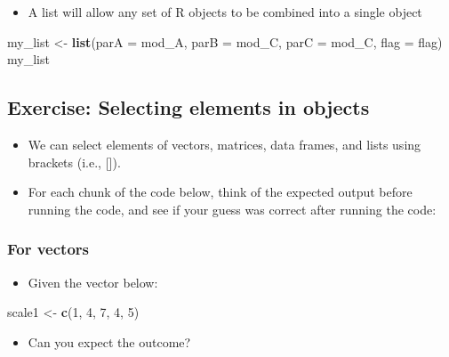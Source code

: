 \documentclass[
]{book}
\newenvironment{Shaded}{\begin{snugshade}}{\end{snugshade}}
\newcommand{\AttributeTok}[1]{\textcolor[rgb]{0.13,0.29,0.53}{#1}}
\newcommand{\DecValTok}[1]{\textcolor[rgb]{0.00,0.00,0.81}{#1}}
\newcommand{\FunctionTok}[1]{\textcolor[rgb]{0.13,0.29,0.53}{\textbf{#1}}}
\newcommand{\NormalTok}[1]{#1}
\newcommand{\OtherTok}[1]{\textcolor[rgb]{0.56,0.35,0.01}{#1}}
\providecommand{\tightlist}{%
  \setlength{\itemsep}{0pt}\setlength{\parskip}{0pt}}
\begin{document}
\begin{itemize}
\tightlist
\item
  A list will allow any set of R objects to be combined into a single object
\end{itemize}

\begin{Shaded}
\begin{Highlighting}[]
\NormalTok{my\_list }\OtherTok{\textless{}{-}} \FunctionTok{list}\NormalTok{(}\AttributeTok{parA =}\NormalTok{ mod\_A, }\AttributeTok{parB =}\NormalTok{ mod\_C, }\AttributeTok{parC =}\NormalTok{ mod\_C, }\AttributeTok{flag =}\NormalTok{ flag)}
\NormalTok{my\_list}
\end{Highlighting}
\end{Shaded}

\subsection{Exercise: Selecting elements in objects}\label{exercise-selecting-elements-in-objects}

\begin{itemize}
\item
  We can select elements of vectors, matrices, data frames, and lists using brackets (i.e., {[}{]}).
\item
  For each chunk of the code below, think of the expected output before running the code, and see if your guess was correct after running the code:
\end{itemize}

\subsubsection{For vectors}\label{for-vectors}

\begin{itemize}
\tightlist
\item
  Given the vector below:
\end{itemize}

\begin{Shaded}
\begin{Highlighting}[]
\NormalTok{scale1 }\OtherTok{\textless{}{-}} \FunctionTok{c}\NormalTok{(}\DecValTok{1}\NormalTok{, }\DecValTok{4}\NormalTok{, }\DecValTok{7}\NormalTok{, }\DecValTok{4}\NormalTok{, }\DecValTok{5}\NormalTok{)}
\end{Highlighting}
\end{Shaded}

\begin{itemize}
\tightlist
\item
  Can you expect the outcome?
\end{itemize}
\end{document}
